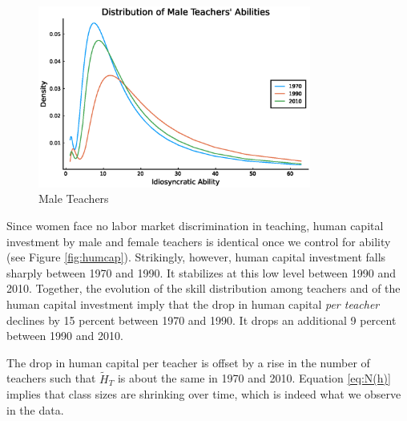 \documentclass[onehalfspacing,11pt]{article}
\begin{document}
	
	\begin{figure}
		\begin{center}
			\includegraphics[width=0.8\textwidth]{fT_men_steadystate.eps}
			\caption{Male Teachers}
			\label{fig:m_ab}
		\end{center}
	\end{figure}
	
	
	
	Since women face no labor market discrimination in teaching, human capital investment by male and female teachers is identical once we control for ability (see Figure \ref{fig:humcap}). Strikingly, however, human capital investment falls sharply between 1970 and 1990. It stabilizes at this low level between 1990 and 2010. Together, the evolution of the skill distribution among teachers and of the human capital investment imply that the drop in human capital {\it per teacher} declines by 15 percent between 1970 and 1990. It drops an additional 9 percent between 1990 and 2010.
	
	The drop in human capital per teacher is offset by a rise in the number of teachers such that $\widetilde{H}_T$ is about the same in 1970 and 2010. Equation \ref{eq:N(h)} implies that class sizes are shrinking over time, which is indeed what we observe in the data.
	
\end{document}
